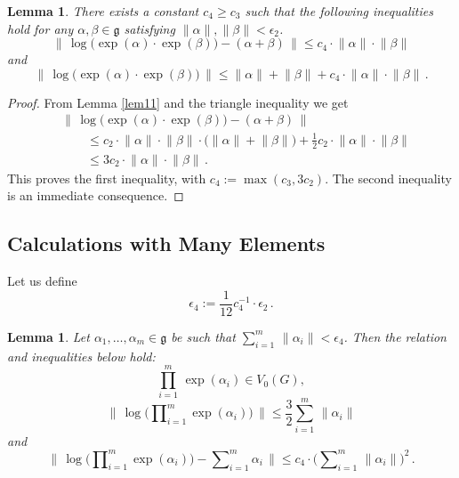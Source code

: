 \documentclass[10pt, a4paper]{amsart}
\newtheorem{lem}[equation]{Lemma}
\theoremstyle{definition}
\numberwithin{equation}{section}
\newcommand{\opn}{\operatorname}
\newcommand{\mfrak}[1]{\mathfrak{#1}}
\newcommand{\smfrac}[2]{{\textstyle \frac{#1}{#2}}}
\newcommand{\norm}[1]{\lVert #1 \rVert}
\newcommand{\Norm}[1]{\bigl\lVert\, #1 \, \bigr\rVert}
\newcommand{\g}{\mfrak{g}}
\begin{document}
\begin{lem} \label{lem16}
There exists a constant $c_4 \geq c_3$ such that the following inequalities
hold for any $\alpha, \beta \in \g$ satisfying
$\norm{\alpha}, \norm{\beta} < \epsilon_2$.
\[ \Norm{ \opn{log} \bigl( \opn{exp}(\alpha) \cdot 
\opn{exp}(\beta) \bigr) -  ( \alpha + \beta ) } \leq
c_{4} \cdot \norm{\alpha} \cdot \norm{\beta} \]
and
\[ \Norm{ \opn{log} \bigl( \opn{exp}(\alpha) \cdot \opn{exp}(\beta) \bigr) }
\leq \norm{\alpha} + \norm{\beta} +
c_{4} \cdot \norm{\alpha} \cdot \norm{\beta} \, . \]
\end{lem}

\begin{proof}
{}From Lemma \ref{lem11} and the triangle inequality we get
\[ \begin{aligned}
& \Norm{ \opn{log} \bigl( \opn{exp}(\alpha) \cdot 
\opn{exp}(\beta) \bigr) -  
( \alpha + \beta ) } \\
& \qquad \leq c_{2} \cdot \norm{\alpha} \cdot \norm{\beta} \cdot 
\bigl( \norm{\alpha} + \norm{\beta} \bigr)  +
\smfrac{1}{2} c_2 \cdot \norm{\alpha} \cdot \norm{\beta} \\
& \qquad \leq 3 c_2  \cdot \norm{\alpha} \cdot \norm{\beta} \, .  
\end{aligned} \]
This proves the first inequality, with
$c_4 := \max (c_3, 3 c_2)$.
The second inequality is an immediate consequence.
\end{proof}

\subsection{Calculations with Many Elements}
Let us define
\begin{equation} \label{eqn:101}
\epsilon_4 :=  \smfrac{1}{12} c_4^{-1} \cdot \epsilon_2 \, . 
\end{equation}

\begin{lem} \label{lem17}
Let $\alpha_1, \ldots, \alpha_m \in \g$ be such that
$\sum_{i = 1}^m\, \norm{\alpha_i} < \epsilon_4$.
Then the relation and inequalities below hold:
\begin{equation} \label{eqn:90}
\prod_{i=1}^m\, \opn{exp}(\alpha_i) \in V_0(G) ,
\end{equation}
\begin{equation} \label{eqn:91}
\Norm{ \opn{log} \bigl( \prod\nolimits_{i=1}^m
\opn{exp}(\alpha_i) \bigr) } \leq 
\smfrac{3}{2} \sum_{i = 1}^m\, \norm{\alpha_i} 
\end{equation}
and
\begin{equation} \label{eqn:92}
\Norm{ \opn{log} \bigl( \prod\nolimits_{i=1}^m
\opn{exp}(\alpha_i) \bigr) - \sum\nolimits_{i=1}^m \alpha_i } \leq
c_4 \cdot \bigl( \sum\nolimits_{i = 1}^m\, \norm{\alpha_i} \bigr)^2 \, .
\end{equation}
\end{lem}
\end{document}
